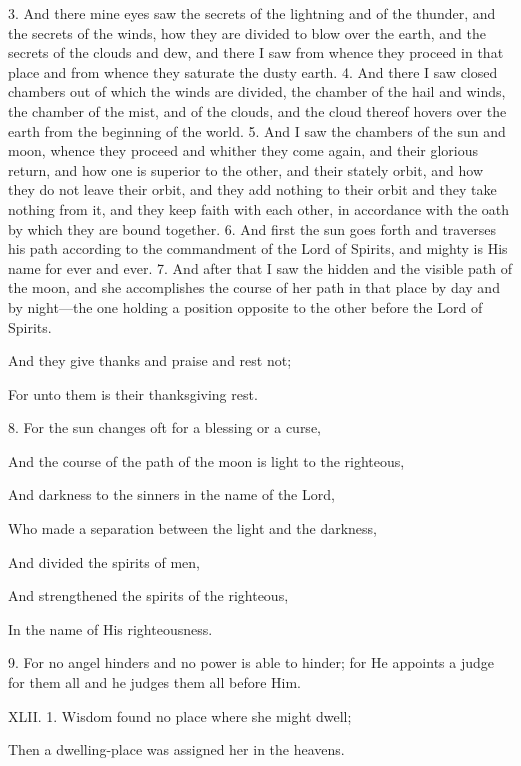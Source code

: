 3. And there mine eyes saw the secrets of the
lightning and of the thunder, and the secrets of the
winds, how they are divided to blow over the earth,
and the secrets of the clouds and dew, and there I
saw from whence they proceed in that place and
from whence they saturate the dusty earth. 4. And
there I saw closed chambers out of which the winds
are divided, the chamber of the hail and winds, the
chamber of the mist, and of the clouds, and the
cloud thereof hovers over the earth from the beginning
of the world. 5. And I saw the chambers of
the sun and moon, whence they proceed and whither
they come again, and their glorious return, and how
one is superior to the other, and their stately orbit,
and how they do not leave their orbit, and they add
nothing to their orbit and they take nothing from it,
and they keep faith with each other, in accordance
with the oath by which they are bound together.
6. And first the sun goes forth and traverses his
path according to the commandment of the Lord of
Spirits, and mighty is His name for ever and ever.
7. And after that I saw the hidden and the visible
path of the moon, and she accomplishes the course
of her path in that place by day and by night—the
one holding a position opposite to the other before
the Lord of Spirits.

And they give thanks and praise and rest not;

For unto them is their thanksgiving rest.

8. For the sun changes oft for a blessing or a curse,

And the course of the path of the moon is light to the righteous,

And darkness to the sinners in the name of the Lord,

Who made a separation between the light and the darkness,

And divided the spirits of men,

And strengthened the spirits of the righteous,

In the name of His righteousness.

9. For no angel hinders and no power is able to
hinder; for He appoints a judge for them all and he
judges them all before Him.


XLII. 1. Wisdom found no place where she might dwell;

Then a dwelling-place was assigned her in the heavens.

